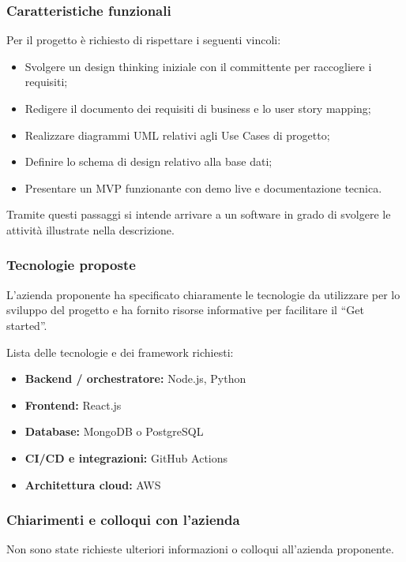 \documentclass[a4paper,11pt]{article}
\begin{document}
\subsubsection{Caratteristiche funzionali}
Per il progetto è richiesto di rispettare i seguenti vincoli:

\begin{itemize}[leftmargin=*]
    \item Svolgere un design thinking iniziale con il committente per raccogliere i requisiti;
    \item Redigere il documento dei requisiti di business e lo user story mapping;
    \item Realizzare diagrammi UML relativi agli Use Cases di progetto;
    \item Definire lo schema di design relativo alla base dati;
    \item Presentare un MVP funzionante con demo live e documentazione tecnica.
\end{itemize}

Tramite questi passaggi si intende arrivare a un software in grado di svolgere le attività illustrate nella descrizione.

\subsubsection{Tecnologie proposte}

L'azienda proponente ha specificato chiaramente le tecnologie da utilizzare per lo sviluppo del progetto e ha fornito risorse informative per facilitare il ``Get started''.

Lista delle tecnologie e dei framework richiesti:

\begin{itemize}[leftmargin=*]
    \item \textbf{Backend / orchestratore:} Node.js, Python
    \item \textbf{Frontend:} React.js
    \item \textbf{Database:} MongoDB o PostgreSQL
    \item \textbf{CI/CD e integrazioni:} GitHub Actions
    \item \textbf{Architettura cloud:} AWS
\end{itemize}

\subsubsection{Chiarimenti e colloqui con l'azienda}
Non sono state richieste ulteriori informazioni o colloqui all'azienda proponente.
\end{document}
